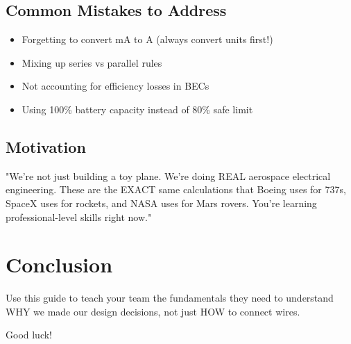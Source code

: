 \documentclass[11pt,letterpaper]{article}
\begin{document}
\subsection{Common Mistakes to Address}
\begin{itemize}
  \item Forgetting to convert mA to A (always convert units first!)
  \item Mixing up series vs parallel rules
  \item Not accounting for efficiency losses in BECs
  \item Using 100\% battery capacity instead of 80\% safe limit
\end{itemize}

\subsection{Motivation}

"We're not just building a toy plane. We're doing REAL aerospace electrical engineering. These are the EXACT same calculations that Boeing uses for 737s, SpaceX uses for rockets, and NASA uses for Mars rovers. You're learning professional-level skills right now."

\section*{Conclusion}

Use this guide to teach your team the fundamentals they need to understand WHY we made our design decisions, not just HOW to connect wires.

Good luck!
\end{document}

